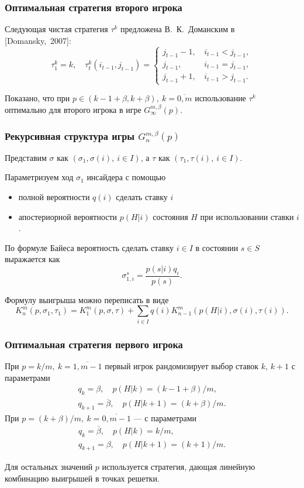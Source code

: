 \documentclass[12pt]{beamer}
\newcommand{\Co}{\beta}
\newcommand{\DCo}{\overline{\beta}}
\begin{document}
\begin{frame}
  \frametitle{Оптимальная стратегия второго игрока}
  
  Следующая чистая стратегия $\tau^k$ предложена В.~К.~Доманским в [Domansky,~2007]:
  \[
    \tau^k_1 = k, \quad \tau^k_t(i_{t-1}, j_{t-1}) = \begin{cases}
      j_{t-1} - 1, & \, i_{t-1} < j_{t-1}, \\
      j_{t-1},     & \, i_{t-1} = j_{t-1}, \\
      j_{t-1} + 1, & \, i_{t-1} > j_{t-1}.
    \end{cases}
  \]
  
  Показано, что при $p \in (k - 1 + \Co, k + \Co),\ k = \overline{0, m}$ использование $\tau^k$ оптимально для второго игрока в игре $G^{m, \Co}_\infty(p)$.
\end{frame}

\begin{frame}
  \frametitle{Рекурсивная структура игры $G^{m, \Co}_n(p)$}
  
  Представим $\sigma$ как $(\sigma_1, \sigma(i),\ i \in I)$, а $\tau$ как $(\tau_1, \tau(i),\ i \in I)$.

  Параметризуем ход $\sigma_1$ инсайдера с помощью 
  \begin{itemize}
  \item
    полной вероятности $q(i)$ сделать ставку $i$
  \item
    апостериорной вероятности $p(H|i)$ состояния $H$ при использовании ставки $i$.
  \end{itemize}
  По формуле Байеса вероятность сделать ставку $i \in I$ в состоянии $s \in S$ выражается как
  \[
    \sigma^s_{1,i} = \frac{p(s|i)q_i}{p(s)}.
  \]

  Формулу выигрыша можно переписать в виде
  \begin{equation*}
    K^m_n(p, \sigma_1, \tau_1) = 
    K^m_1(p, \sigma, \tau) + 
    \sum_{i \in I} q(i) K^m_{n-1}(p(H|i), \sigma(i), \tau(i)).
  \end{equation*}
\end{frame}

\begin{frame}
  \frametitle{Оптимальная стратегия первого игрока}
  
  При $p = k/m,\ k = \overline{1, m-1}$ первый игрок рандомизирует выбор ставок $k, \, k+1$ с параметрами
  \begin{gather*}
    q_k = \Co, \quad p(H|k) = (k-1+\Co)/m,\\
    q_{k+1} = \DCo, \quad p(H|k + 1) = (k + \Co)/m.
  \end{gather*}
  При $p = (k+\Co)/m,\ k = \overline{0, m-1}$ --- с параметрами
  \begin{gather*}
    q_k = \DCo, \quad p(H|k) = k/m,\\
    q_{k+1} = \Co, \quad p(H|k + 1) = (k+1)/m.
  \end{gather*}
  
  Для остальных значений $p$ используется стратегия, дающая линейную комбинацию выигрышей в точках решетки.
\end{frame}
\end{document}
